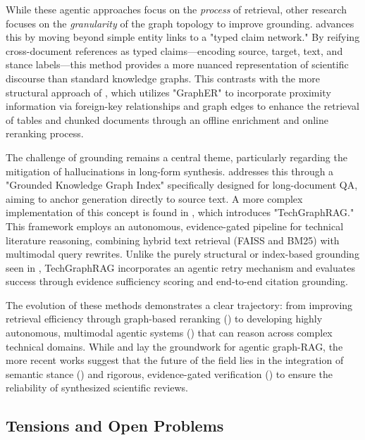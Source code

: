 \documentclass[11pt]{article}
\begin{document}
While these agentic approaches focus on the \textit{process} of retrieval, other research focuses on the \textit{granularity} of the graph topology to improve grounding. \citep{2605.30966} advances this by moving beyond simple entity links to a "typed claim network." By reifying cross-document references as typed claims—encoding source, target, text, and stance labels—this method provides a more nuanced representation of scientific discourse than standard knowledge graphs. This contrasts with the more structural approach of \citep{2603.24925}, which utilizes "GraphER" to incorporate proximity information via foreign-key relationships and graph edges to enhance the retrieval of tables and chunked documents through an offline enrichment and online reranking process.

The challenge of grounding remains a central theme, particularly regarding the mitigation of hallucinations in long-form synthesis. \citep{2604.04359} addresses this through a "Grounded Knowledge Graph Index" specifically designed for long-document QA, aiming to anchor generation directly to source text. A more complex implementation of this concept is found in \citep{2606.01613}, which introduces "TechGraphRAG." This framework employs an autonomous, evidence-gated pipeline for technical literature reasoning, combining hybrid text retrieval (FAISS and BM25) with multimodal query rewrites. Unlike the purely structural or index-based grounding seen in \citep{2604.04359}, TechGraphRAG incorporates an agentic retry mechanism and evaluates success through evidence sufficiency scoring and end-to-end citation grounding.

The evolution of these methods demonstrates a clear trajectory: from improving retrieval efficiency through graph-based reranking (\citep{2603.24925}) to developing highly autonomous, multimodal agentic systems (\citep{2606.01613}) that can reason across complex technical domains. While \citep{2508.05660} and \citep{2509.22009} lay the groundwork for agentic graph-RAG, the more recent works suggest that the future of the field lies in the integration of semantic stance (\citep{2605.30966}) and rigorous, evidence-gated verification (\citep{2606.01613}) to ensure the reliability of synthesized scientific reviews.

\subsection{Tensions and Open Problems}
\end{document}
